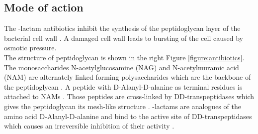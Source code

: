 \subsection{Mode of action}
The \textbeta-lactam antibiotics inhibit the synthesis of the peptidoglycan layer of the bacterial cell wall \cite{noauthor_-lactam_2019}. A damaged cell wall leads to bursting of the cell caused by osmotic pressure. \\
The structure of peptidoglycan is shown in the right Figure \ref{figure:antibiotics}. 
The monosaccharides  N-acetylglucosamine (NAG) and N-acetylmuramic acid (NAM) are alternately linked forming polysaccharides which are the backbone of the peptidoglycan \cite{fisher_bacterial_2005}.
A peptide with D-Alanyl-D-alanine as terminal residues is attached to NAMs \cite{fisher_bacterial_2005}. Those peptides are cross-linked by DD-transpeptidases which gives the peptidoglycan its mesh-like structure \cite{fisher_bacterial_2005}. \textbeta-lactams are analogues of the amino acid D-Alanyl-D-alanine and bind to the active site of DD-transpeptidases which causes an irreversible inhibition of their activity \cite{fisher_bacterial_2005}. 

